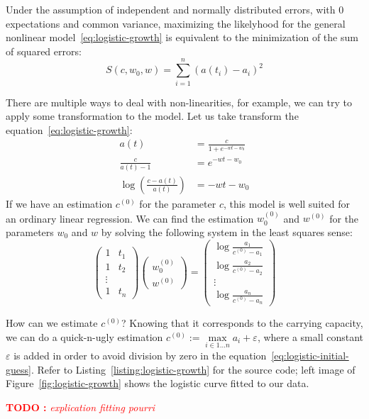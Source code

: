 \documentclass[notitlepage,oneside]{book}
\newcommand\TODO[1]{\textcolor{red}{{\bf TODO :} \it #1}}
\begin{document}
Under the assumption of independent and normally distributed errors, with 0 expectations and common variance, maximizing the likelyhood for the general nonlinear model~\eqref{eq:logistic-growth}
is equivalent to the minimization of the sum of squared errors:
$$
S(c,w_0,w) = \sum\limits_{i=1}^n (a(t_i) - a_i)^2
$$

There are multiple ways to deal with non-linearities, for example, we can try to apply some transformation to the model.
Let us take transform the equation~\eqref{eq:logistic-growth}:
\begin{align*}
a(t) &= \frac{c}{1+e^{-wt - w_0}} \\
\frac{c}{a(t)-1} & = e^{-wt-w_0}  \\
\log\left(\frac{c-a(t)}{a(t)}\right) & = -wt-w_0
\end{align*}
If we have an estimation $c^{(0)}$ for the parameter $c$, this model is well suited for an ordinary linear regression.
We can find the estimation $w_0^{(0)}$ and $w^{(0)}$ for the parameters $w_0$ and $w$ by solving the following system in the least squares sense:
\begin{equation}
\label{eq:logistic-initial-guess}
\begin{pmatrix}
1 & t_1 \\
1 & t_2 \\
\vdots & \\
1 & t_n
\end{pmatrix}
\begin{pmatrix}
w^{(0)}_0\\
w^{(0)}
\end{pmatrix}
=
\begin{pmatrix}
\log\frac{a_1}{c^{(0)} - a_1}\\
\log\frac{a_2}{c^{(0)} - a_2}\\
\vdots \\
\log\frac{a_n}{c^{(0)} - a_n}
\end{pmatrix}
\end{equation}

How can we estimate $c^{(0)}$? Knowing that it corresponds to the carrying capacity, we can do a quick-n-ugly estimation $c^{(0)}:=\max\limits_{i\in 1\dots n} a_i + \varepsilon$, where a small constant $\varepsilon$ is added in order to avoid division by
zero in the equation~\eqref{eq:logistic-initial-guess}.
Refer to Listing~\ref{listing:logistic-growth} for the source code; left image of Figure~\ref{fig:logistic-growth} shows the logistic curve fitted to our data.

\TODO{explication fitting pourri}
\end{document}
